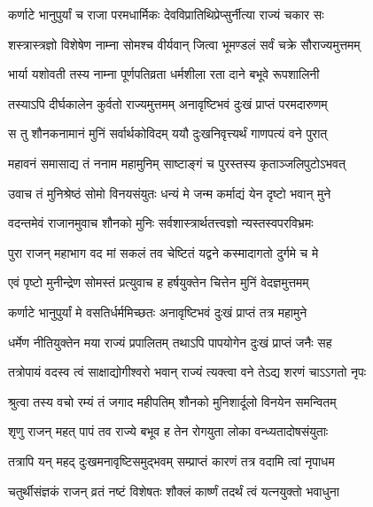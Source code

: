\twolineshloka
{कर्णाटे भानुपुर्यां च राजा परमधार्मिकः}
{देवविप्रातिथिप्रेप्सुर्नीत्या राज्यं चकार सः} %

\twolineshloka
{शस्त्रास्त्रज्ञो विशेषेण नाम्ना सोमश्च वीर्यवान्}
{जित्वा भूमण्डलं सर्वं चक्रे सौराज्यमुत्तमम्} %

\twolineshloka
{भार्या यशोवती तस्य नाम्ना पूर्णपतिव्रता}
{धर्मशीला रता दाने बभूवे रूपशालिनी} %

\twolineshloka
{तस्याऽपि दीर्घकालेन कुर्वतो राज्यमुत्तमम्}
{अनावृष्टिभवं दुःखं प्राप्तं परमदारुणम्} %

\twolineshloka
{स तु शौनकनामानं मुनिं सर्वार्थकोविदम्}
{ययौ दुःखनिवृत्त्यर्थं गाणपत्यं वने पुरात्} %

\twolineshloka
{महावनं समासाद्य तं ननाम महामुनिम्}
{साष्टाङ्गं च पुरस्तस्य कृताञ्जलिपुटोऽभवत्} %

\twolineshloka
{उवाच तं मुनिश्रेष्ठं सोमो विनयसंयुतः}
{धन्यं मे जन्म कर्माद्यं येन दृष्टो भवान् मुने} %

\twolineshloka
{वदन्तमेवं राजानमुवाच शौनको मुनिः}
{सर्वशास्त्रार्थतत्त्वज्ञो न्यस्तस्वपरविभ्रमः} %


\twolineshloka
{पुरा राजन् महाभाग वद मां सकलं तव}
{चेष्टितं यद्वने कस्मादागतो दुर्गमे च मे} %

\twolineshloka
{एवं पृष्टो मुनीन्द्रेण सोमस्तं प्रत्युवाच ह}
{हर्षयुक्तेन चित्तेन मुनिं वेदज्ञमुत्तमम्} %


\twolineshloka
{कर्णाटे भानुपुर्यां मे वसतिर्धर्ममिच्छतः}
{अनावृष्टिभवं दुःखं प्राप्तं तत्र महामुने} %

\twolineshloka
{धर्मेण नीतियुक्तेन मया राज्यं प्रपालितम्}
{तथाऽपि पापयोगेन दुःखं प्राप्तं जनैः सह} %

\twolineshloka
{तत्रोपायं वदस्व त्वं साक्षाद्योगीश्वरो भवान्}
{राज्यं त्यक्त्वा वने तेऽद्य शरणं चाऽऽगतो नृपः} %

\twolineshloka
{श्रुत्वा तस्य वचो रम्यं तं जगाद महीपतिम्}
{शौनको मुनिशार्दूलो विनयेन समन्वितम्} %


\twolineshloka
{श‍ृणु राजन् महत् पापं तव राज्ये बभूव ह}
{तेन रोगयुता लोका वन्ध्यतादोषसंयुताः} %

\twolineshloka
{तत्रापि यन् महद् दुःखमनावृष्टिसमुद्भवम्}
{सम्प्राप्तं कारणं तत्र वदामि त्वां नृपाधम} %

\twolineshloka
{चतुर्थीसंज्ञकं राजन् व्रतं नष्टं विशेषतः}
{शौक्लं कार्ष्णं तदर्थं त्वं यत्नयुक्तो भवाधुना} %

